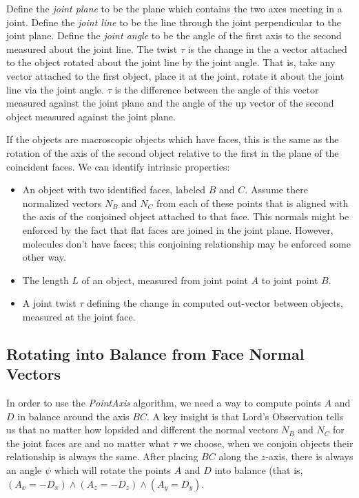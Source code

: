 \documentclass[11pt]{article}
\begin{document}
{Define the {\em joint plane} to be the plane which contains the two axes meeting in a joint.
Define the {\em joint line} to be the line through the joint perpendicular to the joint plane.
Define the {\em joint angle} to be the angle of the first axis to the second measured about
the joint line.
The twist $\tau$ is the change in the a vector attached to the object rotated about the joint
line by the joint angle. That is, take any vector attached to the first object, place it at
the joint, rotate it about the joint line via the joint angle. $\tau$ is the difference
between the angle of this vector measured against the joint plane and the angle of the
up vector of the second object measured against the joint plane.

If the objects are macroscopic objects which have faces, this is the same as the rotation
of the axis of the second object relative to the first in the plane of the coincident faces.
We can identify intrinsic properties:

\begin{itemize}
\item An object with two identified faces, labeled $B$ and $C$. Assume there normalized
  vectors $N_B$ and $N_C$
  from each of these points that is aligned with the axis of the conjoined object attached to
  that face. This normals might be enforced by the fact that flat faces are joined in the joint plane.
  However, molecules don't have faces; this conjoining relationship may be enforced some other way.
\item The length $L$ of an object, measured from joint point $A$ to joint point $B$.
\item A joint twist $\tau$ defining the change in computed out-vector between objects,
  measured at the joint face.
\end{itemize}

\subsection{Rotating into Balance from Face Normal Vectors}

\label{sec:balance}

In order to use the {\em PointAxis} algorithm, we need a way
to compute points $A$ and $D$ in balance around the axis $BC$.
A key insight is that Lord's Observation tells us that no matter how lopsided and different
the normal vectors  $N_B$ and $N_C$ for the joint faces are and no matter what $\tau$ we choose,
when we conjoin objects
their relationship is always the same.
After placing $BC$ along
the $z$-axis, there is always an angle $\psi$ which will
rotate the points $A$ and $D$ into balance (that is, $(A_x = -D_x) \wedge (A_z = -D_z) \wedge (A_y = D_y)$.

}
\end{document}
